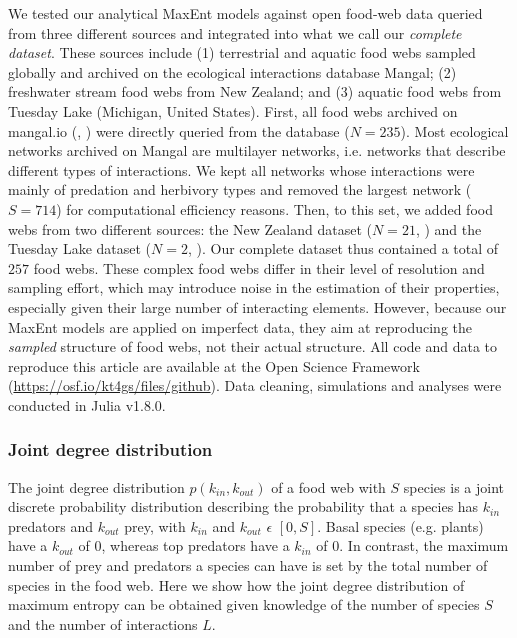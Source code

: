 We tested our analytical MaxEnt models against open food-web data queried from
three different sources and integrated into what we call our \textit{complete
dataset}. These sources include (1) terrestrial and aquatic food webs sampled
globally and archived on the ecological interactions database Mangal; (2)
freshwater stream food webs from New Zealand; and (3) aquatic food webs from
Tuesday Lake (Michigan, United States). First, all food webs archived on
mangal.io (\cite{Poisot2016Mangal}, \cite{Banville2021Mangal}) were directly
queried from the database ($N = 235$). Most ecological networks archived on
Mangal are multilayer networks, i.e. networks that describe different types of
interactions. We kept all networks whose interactions were mainly of predation
and herbivory types and removed the largest network ($S = 714$) for
computational efficiency reasons. Then, to this set, we added food webs from two
different sources: the New Zealand dataset ($N = 21$, \cite{Pomeranz2018Data})
and the Tuesday Lake dataset ($N = 2$, \cite{Cohen2003Ecological}). Our complete
dataset thus contained a total of $257$ food webs. These complex food webs
differ in their level of resolution and sampling effort, which may introduce
noise in the estimation of their properties, especially given their large number
of interacting elements. However, because our MaxEnt models are applied on
imperfect data, they aim at reproducing the \textit{sampled} structure of food
webs, not their actual structure. All code and data to reproduce this article
are available at the Open Science Framework
(\url{https://osf.io/kt4gs/files/github}). Data cleaning, simulations and
analyses were conducted in Julia v1.8.0.

\subsubsection{Joint degree distribution} 

The joint degree distribution $p(k_{in},k_{out})$ of a food web with $S$ species
is a joint discrete probability distribution describing the probability that a
species has $k_{in}$ predators and $k_{out}$ prey, with $k_{in}$ and $k_{out}$
$\epsilon$ $[0, S]$. Basal species (e.g. plants) have a $k_{out}$ of $0$,
whereas top predators have a $k_{in}$ of $0$. In contrast, the maximum number of
prey and predators a species can have is set by the total number of species in
the food web. Here we show how the joint degree distribution of maximum entropy
can be obtained given knowledge of the number of species $S$ and the number of
interactions $L$.

